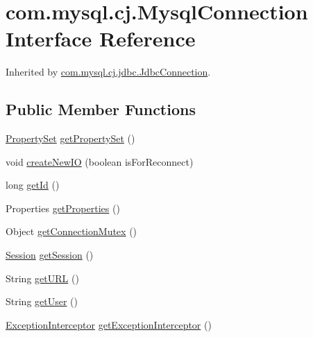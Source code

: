\hypertarget{interfacecom_1_1mysql_1_1cj_1_1_mysql_connection}{}\section{com.\+mysql.\+cj.\+Mysql\+Connection Interface Reference}
\label{interfacecom_1_1mysql_1_1cj_1_1_mysql_connection}


Inherited by \mbox{\hyperlink{interfacecom_1_1mysql_1_1cj_1_1jdbc_1_1_jdbc_connection}{com.\+mysql.\+cj.\+jdbc.\+Jdbc\+Connection}}.

\subsection*{Public Member Functions}
\begin{DoxyCompactItemize}
\item 
\mbox{\hyperlink{interfacecom_1_1mysql_1_1cj_1_1conf_1_1_property_set}{Property\+Set}} \mbox{\hyperlink{interfacecom_1_1mysql_1_1cj_1_1_mysql_connection_a51fb6a3db410136a80cda075db6a70f5}{get\+Property\+Set}} ()
\item 
void \mbox{\hyperlink{interfacecom_1_1mysql_1_1cj_1_1_mysql_connection_a95370bad49129eb6c1f5136e008e6ed1}{create\+New\+IO}} (boolean is\+For\+Reconnect)
\item 
long \mbox{\hyperlink{interfacecom_1_1mysql_1_1cj_1_1_mysql_connection_aba5831e0b7016bc8b3fffa0c2e728fee}{get\+Id}} ()
\item 
Properties \mbox{\hyperlink{interfacecom_1_1mysql_1_1cj_1_1_mysql_connection_a1fde8714cc1e2176748fd4f35f0df0d1}{get\+Properties}} ()
\item 
Object \mbox{\hyperlink{interfacecom_1_1mysql_1_1cj_1_1_mysql_connection_a9509cf17d31eff921de41b8ecd03278f}{get\+Connection\+Mutex}} ()
\item 
\mbox{\hyperlink{interfacecom_1_1mysql_1_1cj_1_1_session}{Session}} \mbox{\hyperlink{interfacecom_1_1mysql_1_1cj_1_1_mysql_connection_ac1220f01fc29222847acfba3035a860a}{get\+Session}} ()
\item 
String \mbox{\hyperlink{interfacecom_1_1mysql_1_1cj_1_1_mysql_connection_a8fab6ed57d7f54fbd017890355b610a2}{get\+U\+RL}} ()
\item 
String \mbox{\hyperlink{interfacecom_1_1mysql_1_1cj_1_1_mysql_connection_adc3ee83d060d0d48cb92e181dc5cbbb6}{get\+User}} ()
\item 
\mbox{\hyperlink{interfacecom_1_1mysql_1_1cj_1_1exceptions_1_1_exception_interceptor}{Exception\+Interceptor}} \mbox{\hyperlink{interfacecom_1_1mysql_1_1cj_1_1_mysql_connection_a90d92a3170923d8e05d748f2079dca15}{get\+Exception\+Interceptor}} ()

\end{DoxyCompactItemize}
